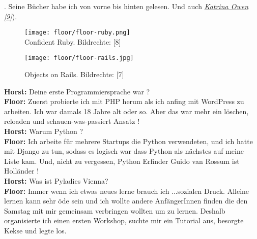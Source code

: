 \documentclass[10pt,a4paper,ngerman,twoside]{article} %
\begin{document}
. Seine Bücher habe ich von vorne bis hinten gelesen. Und auch \href{http://kytrinyx.com/}{\textit{Katrina Owen [9]}}). \\
\begin{figure}
\texttt{[image: floor/floor-ruby.png]} \\
\caption{Confident Ruby. Bildrechte: [8]}
\texttt{[image: floor/floor-rails.jpg]} \\
\caption{Objects on Rails. Bildrechte: [7]} 
\end{figure}
\textbf{Horst:} Deine erste Programmiersprache war ? \\
\textbf{Floor:} Zuerst probierte ich mit PHP herum als ich anfing mit WordPress zu arbeiten. Ich war damals 18 Jahre alt oder so. Aber das war mehr ein löschen, reloaden und schauen-was-passiert Ansatz ! \\
\textbf{Horst:} Warum Python ? \\
\textbf{Floor:} Ich arbeite für mehrere Startups die Python verwendeten, und ich hatte mit Django zu tun, sodass es logisch war dass Python als nächstes auf meine Liste kam. Und, nicht zu vergessen, Python Erfinder Guido van Rossum ist Holländer ! \\
\textbf{Horst:} Was ist Pyladies Vienna? \\
\textbf{Floor:} Immer wenn ich etwas neues lerne brauch ich ...sozialen Druck. Alleine lernen kann sehr öde sein und ich wollte andere AnfängerInnen finden die den Samstag mit mir gemeinsam verbringen wollten um zu lernen. Deshalb organisierte ich einen ersten Workshop, suchte mir ein Tutorial aus, besorgte Kekse und legte los.
\end{document}
